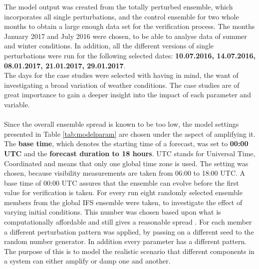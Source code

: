 The model output was created from the totally perturbed ensemble, which incorporates all single perturbations, and the control ensemble for two whole months to obtain a large enough data set for the verification process.
The months January 2017 and July 2016 were chosen, to be able to analyse data of summer and winter conditions.
In addition, all the different versions of single perturbations were run for the following selected dates: \textbf{10.07.2016, 14.07.2016, 08.01.2017, 21.01.2017, 29.01.2017}.\\
The days for the case studies were selected with having in mind, the want of investigating a broad variation of weather conditions. The case studies are of great importance to gain a deeper insight into the impact of each parameter and variable.\\ \\
Since the overall ensemble spread is known to be too low, the model settings presented in Table \ref{tab:modelparam} are chosen under the aspect of amplifying it.\\
The \textbf{base time}, which denotes the starting time of a forecast, was set to \textbf{00:00 UTC} and the \textbf{forecast duration to 18 hours}. UTC stands for Universal Time, Coordinated and means that only one global time zone is used. The setting was chosen, because visibility measurements are taken from 06:00 to 18:00 UTC. A base time of 00:00 UTC assures that the ensemble can evolve before the first value for verification is taken.
For every run eight randomly selected ensemble members from the global IFS ensemble were taken, to investigate the effect of varying initial conditions. This number was chosen based upon what is computationally affordable and still gives a reasonable spread \cite{buizza1998impact}.
For each member a different perturbation pattern was applied, by passing on a different seed to the random number generator. In addition every parameter has a different pattern.
The purpose of this is to model the realistic scenario that different components in a system can either amplify or damp one and another.\\


